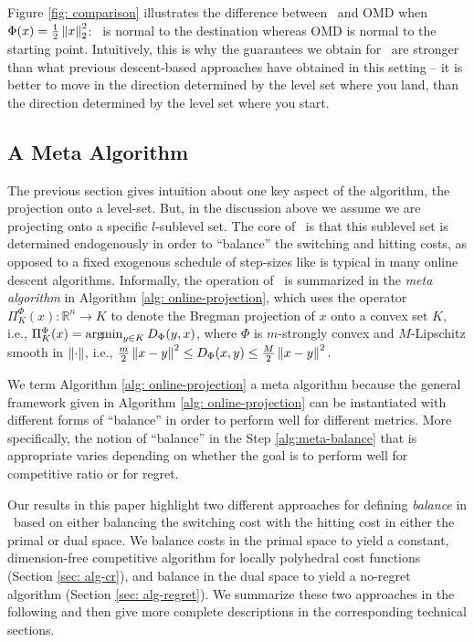Figure \ref{fig: comparison} illustrates the difference between \ourack\ and OMD when $\Phi(x) = \frac{1}{2}\left\lVert x \right\rVert^2_2$: \ourack\ is normal to the destination whereas OMD is normal to the starting point. Intuitively, this is why the guarantees we obtain for \ourack\ are stronger than what previous descent-based approaches have obtained in this setting -- it is better to move in the direction determined by the level set where you land, than the direction determined by the level set where you start. 

\subsection{A Meta Algorithm}
\label{sec:alg-description}

The previous section gives intuition about one key aspect of the algorithm, the projection onto a level-set.  But, in the discussion above we assume we are projecting onto a specific $l$-sublevel set. The core of \ourack\ is that this sublevel set is determined endogenously in order to ``balance'' the switching and hitting costs, as opposed to a fixed exogenous schedule of step-sizes like is typical in many online descent algorithms. Informally, the operation of \ourack\ is summarized in the \emph{meta algorithm} in Algorithm \ref{alg: online-projection}, which uses the operator $\Pi^\Phi_K(x) : \mathbb{R}^n \rightarrow K$ to denote the Bregman projection of $x$ onto a convex set $K$, i.e., $\Pi^\Phi_K(x) = \operatorname*{arg\!min}_{y \in K} D_\Phi(y, x)$, where $\Phi$ is $m$-strongly convex and $M$-Lipschitz smooth in $\left\lVert \cdot \right\rVert$, i.e., $ \frac{m}{2} \left\lVert x-y \right\rVert^2 \le D_\Phi(x,y) \le \frac{M}{2} \left\lVert x-y \right\rVert^2.$



We term Algorithm \ref{alg: online-projection} a meta algorithm because the general framework given in Algorithm \ref{alg: online-projection} can be instantiated with different forms of ``balance'' in order to perform well for different metrics.  More specifically, the notion of ``balance'' in the Step \ref{alg:meta-balance} that is appropriate varies depending on whether the goal is to perform well for competitive ratio or for regret.  

Our results in this paper highlight two different approaches for defining \emph{balance} in \ourack\ based on either balancing the switching cost with the hitting cost in either the primal or dual space.  We  balance costs in the primal space to yield a constant, dimension-free competitive algorithm for locally polyhedral cost functions (Section \ref{sec: alg-cr}), and balance in the dual space to yield a no-regret algorithm (Section \ref{sec: alg-regret}). We summarize these two approaches in the following and then give more complete descriptions in the corresponding technical sections.  


